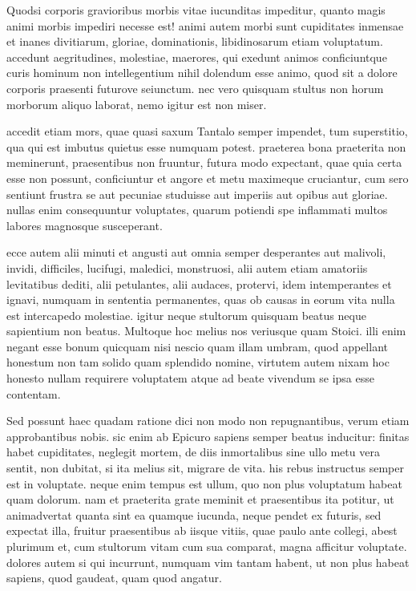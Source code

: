  Quodsi corporis gravioribus morbis vitae iucunditas impeditur, quanto magis animi morbis impediri necesse est! animi autem morbi sunt cupiditates inmensae et inanes divitiarum, gloriae, dominationis, libidinosarum etiam voluptatum. accedunt aegritudines, molestiae, maerores, qui exedunt animos conficiuntque curis hominum non intellegentium nihil dolendum esse animo, quod sit a dolore corporis praesenti futurove seiunctum. nec vero quisquam stultus non horum morborum aliquo laborat, nemo igitur est non miser.

 accedit etiam mors, quae quasi saxum Tantalo semper impendet, tum superstitio, qua qui est imbutus quietus esse numquam potest. praeterea bona praeterita non meminerunt, praesentibus non fruuntur, futura modo expectant, quae quia certa esse non possunt, conficiuntur et angore et metu maximeque cruciantur, cum sero sentiunt frustra se aut pecuniae studuisse aut imperiis aut opibus aut gloriae. nullas enim consequuntur voluptates, quarum potiendi spe inflammati multos labores magnosque susceperant.

 ecce autem alii minuti et angusti aut omnia semper desperantes aut malivoli, invidi, difficiles, lucifugi, maledici, monstruosi, alii autem etiam amatoriis levitatibus dediti, alii petulantes, alii audaces, protervi, idem intemperantes et ignavi, numquam in sententia permanentes, quas ob causas in eorum vita nulla est intercapedo molestiae. igitur neque stultorum quisquam beatus neque sapientium non beatus. Multoque hoc melius nos veriusque quam Stoici. illi enim negant esse bonum quicquam nisi nescio quam illam umbram, quod appellant honestum non tam solido quam splendido nomine, virtutem autem nixam hoc honesto nullam requirere voluptatem atque ad beate vivendum se ipsa esse contentam.

 Sed possunt haec quadam ratione dici non modo non repugnantibus, verum etiam approbantibus nobis. sic enim ab Epicuro sapiens semper beatus inducitur: finitas habet cupiditates, neglegit mortem, de diis inmortalibus sine ullo metu vera sentit, non dubitat, si ita melius sit, migrare de vita. his rebus instructus semper est in voluptate. neque enim tempus est ullum, quo non plus voluptatum habeat quam dolorum. nam et praeterita grate meminit et praesentibus ita potitur, ut animadvertat quanta sint ea quamque iucunda, neque pendet ex futuris, sed expectat illa, fruitur praesentibus ab iisque vitiis, quae paulo ante collegi, abest plurimum et, cum stultorum vitam cum sua comparat, magna afficitur voluptate. dolores autem si qui incurrunt, numquam vim tantam habent, ut non plus habeat sapiens, quod gaudeat, quam quod angatur.

